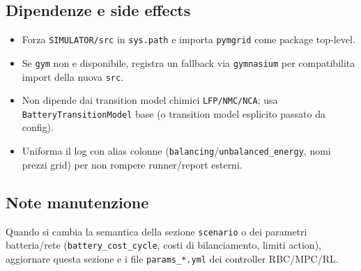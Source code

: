 \subsection*{Dipendenze e side effects}
\begin{itemize}[leftmargin=1.2cm]
\item Forza \texttt{SIMULATOR/src} in \texttt{sys.path} e importa \texttt{pymgrid} come package top-level.
\item Se \texttt{gym} non e disponibile, registra un fallback via \texttt{gymnasium} per compatibilita import della nuova \texttt{src}.
\item Non dipende dai transition model chimici \texttt{LFP/NMC/NCA}; usa \texttt{BatteryTransitionModel} base (o transition model esplicito passato da config).
\item Uniforma il log con alias colonne (\texttt{balancing}/\texttt{unbalanced\_energy}, nomi prezzi grid) per non rompere runner/report esterni.
\end{itemize}

\subsection*{Note manutenzione}
Quando si cambia la semantica della sezione \texttt{scenario} o dei parametri batteria/rete (\texttt{battery\_cost\_cycle}, costi di bilanciamento, limiti action), aggiornare questa sezione e i file \texttt{params\_*.yml} dei controller RBC/MPC/RL.
